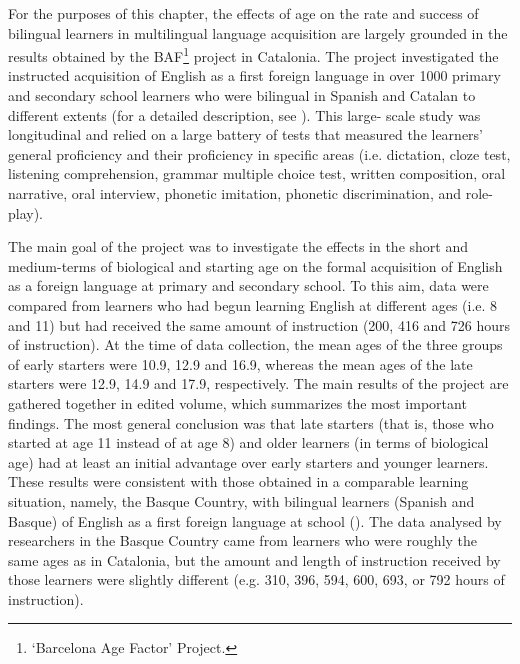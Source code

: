 \documentclass[output=paper,colorlinks,citecolor=brown,nonflat]{langsci/langscibook}
\begin{document}
For the purposes of this chapter, the effects of age on the rate and success of bilingual learners in multilingual language acquisition are largely grounded in the results obtained by the BAF\footnote{ \textrm{‘Barcelona Age Factor’ Project.}} project in Catalonia. The project investigated the instructed acquisition of English as a first foreign language in over 1000 primary and secondary school learners who were bilingual in Spanish and Catalan to different extents (for a detailed description, see \citealt{Muñoz2000}). This large- scale study was longitudinal and relied on a large battery of tests that measured the learners’ general proficiency and their proficiency in specific areas (i.e. dictation, cloze test, listening comprehension, grammar multiple choice test, written composition, oral narrative, oral interview, phonetic imitation, phonetic discrimination, and role-play).

The main goal of the project was to investigate the effects in the short and medium-terms of biological and starting age on the formal acquisition of English as a foreign language at primary and secondary school. To this aim, data were compared from learners who had begun learning English at different ages (i.e. 8 and 11) but had received the same amount of instruction (200, 416 and 726 hours of instruction). At the time of data collection, the mean ages of the three groups of early starters were 10.9, 12.9 and 16.9, whereas the mean ages of the late starters were 12.9, 14.9 and 17.9, respectively. The main results of the project are gathered together in  edited volume, which summarizes the most important findings. The most general conclusion was that late starters (that is, those who started at age 11 instead of at age 8) and older learners (in terms of biological age) had at least an initial advantage over early starters and younger learners. These results were consistent with those obtained in a comparable learning situation, namely, the Basque Country, with bilingual learners (Spanish and Basque) of English as a first foreign language at school (\citealt{García-MayoGarcía-Lecumberri2003}). The data analysed by researchers in the Basque Country came from learners who were roughly the same ages as in Catalonia, but the amount and length of instruction received by those learners were slightly different (e.g. 310, 396, 594, 600, 693, or 792 hours of instruction).
\end{document}
